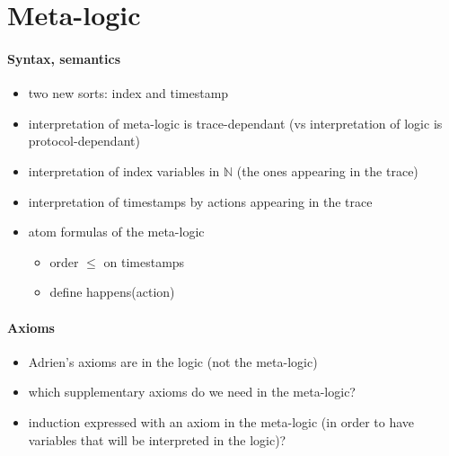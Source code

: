 \section{Meta-logic}

\paragraph{Syntax, semantics}

\begin{itemize}
  \item two new sorts: index and timestamp
  \item interpretation of meta-logic is trace-dependant (vs interpretation of logic is protocol-dependant)
  \item interpretation of index variables in $\mathbb{N}$ (the ones appearing in the trace)
  \item interpretation of timestamps by actions appearing in the trace
  \item atom formulas of the meta-logic
  \begin{itemize}
    \item order $\leq$ on timestamps
    \item define happens(action)
  \end{itemize}
\end{itemize}

\paragraph{Axioms}

\begin{itemize}
  \item Adrien's axioms are in the logic (not the meta-logic)
  \item which supplementary axioms do we need in the meta-logic?
  \item induction expressed with an axiom in the meta-logic (in order to have variables that will be interpreted in the logic)?
\end{itemize}
